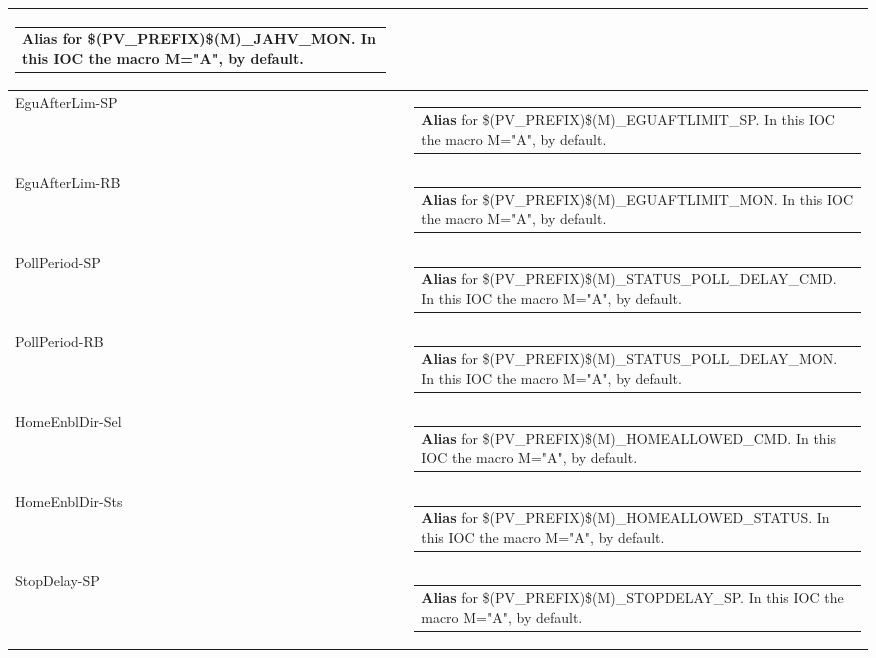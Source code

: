 \documentclass[openany]{article}
\begin{document}
\begin{longtable}{| m{4.5cm} m{2.5cm}  m{8.0cm} |}
\begin{tabular}{@{}m{6cm}@{}}
                \textbf{Alias} for \$(PV\_PREFIX)\$(M)\_JAHV\_MON. In this IOC the macro M="A", by default.
            \end{tabular} \hypertarget{}{}\\ \hline
        EguAfterLim-SP &  & \begin{tabular}{@{}m{6cm}@{}}
                \textbf{Alias} for \$(PV\_PREFIX)\$(M)\_EGUAFTLIMIT\_SP. In this IOC the macro M="A", by default.
            \end{tabular} \hypertarget{}{}\\ \hline
        EguAfterLim-RB &  & \begin{tabular}{@{}m{6cm}@{}}
                \textbf{Alias} for \$(PV\_PREFIX)\$(M)\_EGUAFTLIMIT\_MON. In this IOC the macro M="A", by default.
            \end{tabular} \hypertarget{}{}\\ \hline
        PollPeriod-SP &  & \begin{tabular}{@{}m{6cm}@{}}
                \textbf{Alias} for \$(PV\_PREFIX)\$(M)\_STATUS\_POLL\_DELAY\_CMD. In this IOC the macro M="A", by default.
            \end{tabular} \hypertarget{}{}\\ \hline
        PollPeriod-RB &  & \begin{tabular}{@{}m{6cm}@{}}
                \textbf{Alias} for \$(PV\_PREFIX)\$(M)\_STATUS\_POLL\_DELAY\_MON. In this IOC the macro M="A", by default.
            \end{tabular} \hypertarget{}{}\\ \hline
        HomeEnblDir-Sel &  & \begin{tabular}{@{}m{6cm}@{}}
                \textbf{Alias} for \$(PV\_PREFIX)\$(M)\_HOMEALLOWED\_CMD. In this IOC the macro M="A", by default.
            \end{tabular} \hypertarget{}{}\\ \hline
        HomeEnblDir-Sts &  & \begin{tabular}{@{}m{6cm}@{}}
                \textbf{Alias} for \$(PV\_PREFIX)\$(M)\_HOMEALLOWED\_STATUS. In this IOC the macro M="A", by default.
            \end{tabular} \hypertarget{}{}\\ \hline
        StopDelay-SP &  & \begin{tabular}{@{}m{6cm}@{}}
                \textbf{Alias} for \$(PV\_PREFIX)\$(M)\_STOPDELAY\_SP. In this IOC the macro M="A", by default.

\end{tabular}
\end{longtable}
\end{document}
